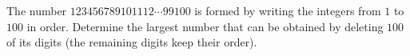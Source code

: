 The number $123456789101112\cdots99100$ is formed by writing the integers from $1$ to $100$ in order. Determine the largest number that can be obtained by deleting $100$ of its digits (the remaining digits keep their order).
